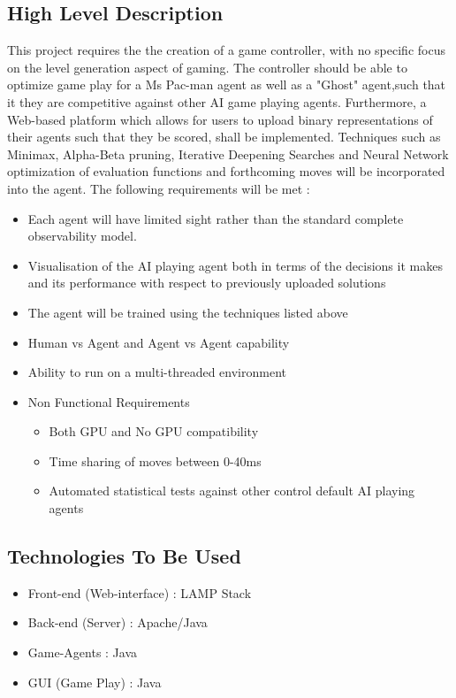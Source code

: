 \documentclass[11pt]{article}
\begin{document}
\subsection{High Level Description}
This project requires the the creation of a game controller, with no specific focus on the level generation aspect of gaming. The controller should be able to optimize game play for a Ms Pac-man agent as well as a "Ghost" agent,such that it they are competitive against other AI game playing agents.
\newline Furthermore, a Web-based platform which allows for users to upload binary representations of their agents such that they be scored, shall be implemented. 
\newline Techniques such as Minimax, Alpha-Beta pruning, Iterative Deepening Searches and Neural Network optimization of evaluation functions and forthcoming moves will be incorporated into the agent. The following requirements will be met : 
\begin{itemize}
\item Each agent will have limited sight rather than the standard complete observability model. 
\item Visualisation of the AI playing agent both in terms of the decisions it makes and its performance with respect to previously uploaded solutions 
\item The agent will be trained using the techniques listed above 
\item Human vs Agent and Agent vs Agent capability
\item Ability to run on a multi-threaded environment  
\item Non Functional Requirements
\begin{itemize}
\item Both GPU and No GPU compatibility
\item Time sharing of moves between 0-40ms
\item Automated statistical tests against other control default AI playing agents 

\end{itemize}

\end{itemize}

\subsection{Technologies To Be Used}
\begin{itemize}
\item Front-end (Web-interface) : LAMP Stack
\item Back-end (Server) : Apache/Java
\item Game-Agents : Java
\item GUI (Game Play) : Java
\end{itemize}
\end{document}
